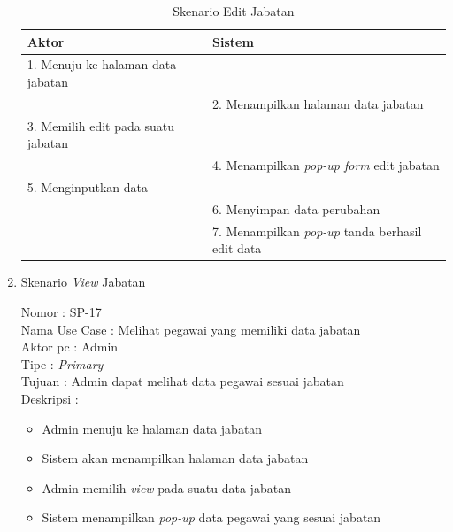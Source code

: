 \begin{enumerate}
\begin{itemize}
\end{itemize}

\begin{table}
	\caption{Skenario Edit Jabatan}
	\centering
	\begin{tabular}{ | p{58mm} | p{70mm} |}
		\hline 
		\textbf{Aktor} & \textbf{Sistem} \\
		\hline
		
		1.	Menuju ke halaman data jabatan &  \\
		
		\hline
		
		&  2.	Menampilkan halaman data jabatan \\
		
		\hline
		
		3. Memilih edit pada suatu jabatan & \\
		
		\hline
		
		& 4.	Menampilkan\textit{ pop-up form} edit jabatan \\
		
		\hline
		
		5.	Menginputkan data  & \\
		\hline
		
		& 6.	Menyimpan data perubahan \\
		\hline
		
		& 7.	Menampilkan \textit{pop-up} tanda berhasil edit data \\
		\hline
		
	\end{tabular}
\end{table}

\item Skenario \textit{View} Jabatan

Nomor \kern 3.6pc : SP-17 \\
Nama Use Case : Melihat pegawai yang memiliki data jabatan \\
Aktor  pc : Admin \\
Tipe \kern 4.6pc : \textit{Primary} \\
Tujuan \kern 3.6pc : Admin dapat melihat data pegawai sesuai jabatan \\
Deskripsi \kern 2.5pc : 

\begin{itemize}
	\item Admin menuju ke halaman data jabatan
	\item Sistem akan menampilkan halaman data jabatan
	\item Admin memilih \textit{view} pada suatu data jabatan
	\item Sistem menampilkan \textit{pop-up} data pegawai yang sesuai jabatan
	

\end{itemize}
\end{enumerate}
